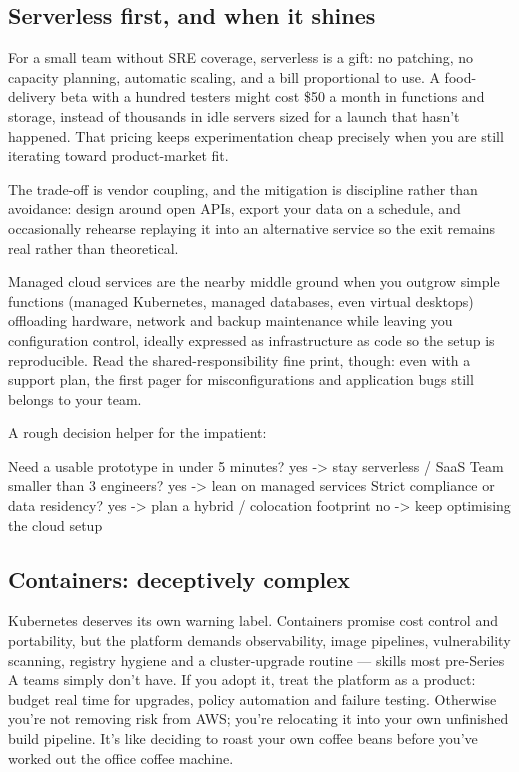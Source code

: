 \subsection{Serverless first, and when it shines}


For a small team without SRE coverage, serverless is a gift: no patching, no capacity planning, automatic scaling, and a bill proportional to use. A food-delivery beta with a hundred testers might cost \$50 a month in functions and storage, instead of thousands in idle servers sized for a launch that hasn't happened. That pricing keeps experimentation cheap precisely when you are still iterating toward product-market fit.


The trade-off is vendor coupling, and the mitigation is discipline rather than avoidance: design around open APIs, export your data on a schedule, and occasionally rehearse replaying it into an alternative service so the exit remains real rather than theoretical.


Managed cloud services are the nearby middle ground when you outgrow simple functions (managed Kubernetes, managed databases, even virtual desktops) offloading hardware, network and backup maintenance while leaving you configuration control, ideally expressed as infrastructure as code so the setup is reproducible. Read the shared-responsibility fine print, though: even with a support plan, the first pager for misconfigurations and application bugs still belongs to your team.


A rough decision helper for the impatient:



\begin{CodeBlock}
Need a usable prototype in under 5 minutes?
  yes -> stay serverless / SaaS
Team smaller than 3 engineers?
  yes -> lean on managed services
Strict compliance or data residency?
  yes -> plan a hybrid / colocation footprint
  no  -> keep optimising the cloud setup
\end{CodeBlock}



\subsection{Containers: deceptively complex}


Kubernetes deserves its own warning label. Containers promise cost control and portability, but the platform demands observability, image pipelines, vulnerability scanning, registry hygiene and a cluster-upgrade routine — skills most pre-Series A teams simply don't have. If you adopt it, treat the platform as a product: budget real time for upgrades, policy automation and failure testing. Otherwise you're not removing risk from AWS; you're relocating it into your own unfinished build pipeline. It's like deciding to roast your own coffee beans before you've worked out the office coffee machine.


